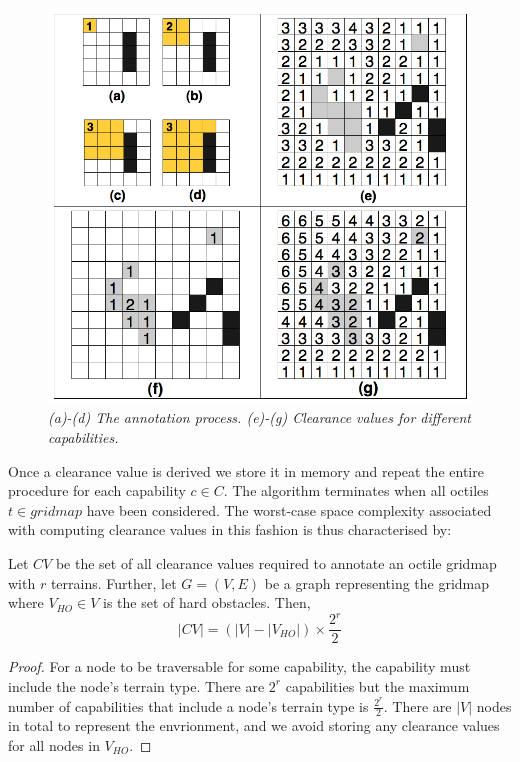 \begin{figure}[htbp]
       \caption{\emph{(a)-(d) The annotation process. (e)-(g) Clearance values for different capabilities.}}
       \begin{center}
                       \includegraphics[scale=0.25]{diagrams/annotations.png}
       \end{center}
       \label{aha-fig:annotations}
\end{figure}

Once a clearance value is derived we store it in memory and repeat the entire procedure for each capability $c \in C$.  
The algorithm terminates when all octiles $t \in gridmap$ have been considered. 
The worst-case space complexity associated with computing clearance values in this fashion is thus characterised by: 
\begin{lemma}
\label{aha-lemma:numannotations}
Let $CV$ be the set of all clearance values required to annotate an octile gridmap with $r$ terrains. Further, let $G = (V, E)$ be a graph representing the gridmap where $V_{HO} \in V$ is the set of hard obstacles. Then, 
$$|CV| = (|V| - |V_{HO}|)\times \frac{2^r}{2}$$
\end{lemma}

\begin{proof}
For a node to be traversable for some capability, the capability must include the node's terrain type. 
There are $2^r$ capabilities but the maximum number of capabilities that include a node's terrain type is $\frac{2^r}{2}$. 
There are $|V|$ nodes in total to represent the envrionment, and we avoid storing any clearance values for all nodes in $V_{HO}$. 
\end{proof}

